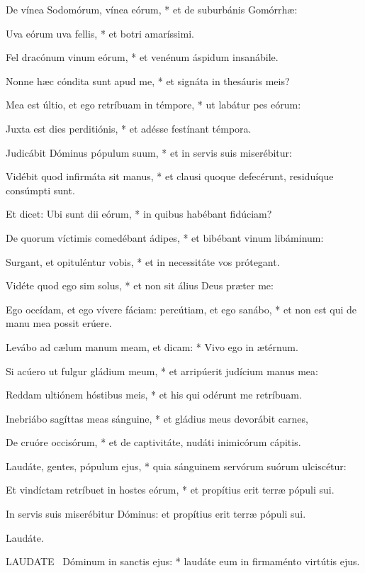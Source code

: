 De vínea Sodomórum, vínea eórum, * et de suburbánis Gomórrhæ:

Uva eórum uva fellis, * et botri amaríssimi.

Fel dracónum vinum eórum, * et venénum áspidum insanábile.

Nonne hæc cóndita sunt apud me, * et signáta in thesáuris meis?

Mea est últio, et ego retríbuam in témpore, * ut labátur pes eórum:

Juxta est dies perditiónis, * et adésse festínant témpora.

Judicábit Dóminus pópulum suum, * et in servis suis miserébitur:

Vidébit quod infirmáta sit manus, * et clausi quoque defecérunt, residuíque consúmpti sunt.

Et dicet: Ubi sunt dii eórum, * in quibus habébant fidúciam?

De quorum víctimis comedébant ádipes, * et bibébant vinum libáminum:

Surgant, et opituléntur vobis, * et in necessitáte vos prótegant.

Vidéte quod ego sim solus, * et non sit álius Deus præter me:

Ego occídam, et ego vívere fáciam: percútiam, et ego sanábo, * et non est qui de manu mea possit erúere.

Levábo ad cælum manum meam, et dicam: * Vivo ego in ætérnum.

Si acúero ut fulgur gládium meum, * et arripúerit judícium manus mea:

Reddam ultiónem hóstibus meis, * et his qui odérunt me retríbuam.

Inebriábo sagíttas meas sánguine, * et gládius meus devorábit carnes,

De cruóre occisórum, * et de captivitáte, nudáti inimicórum cápitis.

Laudáte, gentes, pópulum ejus, * quia sánguinem servórum suórum ulciscétur:

Et vindíctam retríbuet in hostes eórum, * et propítius erit terræ pópuli sui.

 In servis suis miserébitur Dóminus: et propítius erit terræ pópuli sui.

 Laudáte. \textdagger


\lettrine[lines=2]{L}{AUDATE} \textdagger\ Dóminum in sanctis ejus: * laudáte eum in firmaménto virtútis ejus.

